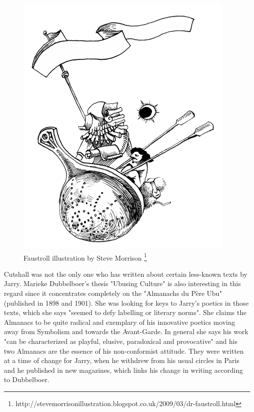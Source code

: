\begin{figure}[h] %
  \centering
  \includegraphics[height=0.3\textheight]{images/faustroll.jpg}
  \caption[Faustroll]{Faustroll illustration by Steve Morrison \footnote{http://stevemorrisonillustration.blogspot.co.uk/2009/03/dr-faustroll.html}}
  \label{fig:FAUSTROLL}
\end{figure}

Cutshall was not the only one who has written about certain less-known texts by Jarry. Marieke Dubbelboer's thesis "Ubusing Culture" is also interesting in this regard since it concentrates completely on the "Almanachs du Père Ubu" (published in 1898 and 1901)\citep{Dubbelboer2009}. She was looking for keys to Jarry's poetics in those texts, which she says "seemed to defy labelling or literary norms"\citep[p.10]{Dubbelboer2009}. She claims the Almanacs to be quite radical and exemplary of his innovative poetics moving away from Symbolism and towards the Avant-Garde. In general she says his work "can be characterized as playful, elusive, paradoxical and provocative"\citep[p.197]{Dubbelboer2009} and his two Almanacs are the essence of his non-conformist attitude. They were written at a time of change for Jarry, when he withdrew from his usual circles in Paris and he published in new magazines, which links his change in writing according to Dubbelboer.

